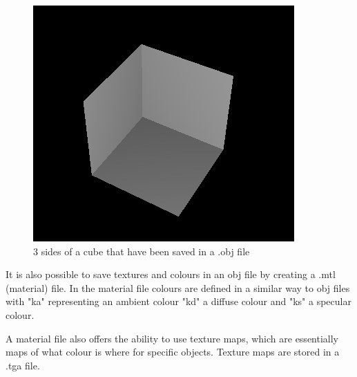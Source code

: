 	
	\begin{figure}[H]
		\centering
		\includegraphics[width=0.5\linewidth]{Includes/images/half-box}
		\caption{3 sides of a cube that have been saved in a .obj file}
		\label{fig:half-box}
	\end{figure}
	
	It is also possible to save textures and colours in an obj file by creating a .mtl (material) file. In the material file colours are defined in a similar way to obj files with "ka" representing an ambient colour "kd" a diffuse colour and "ks" a specular colour. 
	
	A material file also offers the ability to use texture maps, which are essentially maps of what colour is where for specific objects. Texture maps are stored in a .tga file.
	
	
		

	


